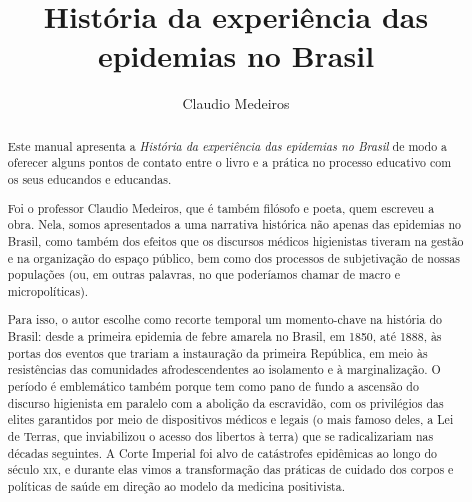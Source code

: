 \documentclass[12pt]{extarticle}
\begin{document}
\newcommand{\AutorLivro}{Claudio Medeiros}
\newcommand{\TituloLivro}{História da experiência das epidemias no Brasil}
\newcommand{\Tema}{Diálogos com a sociologia e com a antropologia}
\newcommand{\Genero}{Narrativa histórica}
\newcommand{\imagemCapa}{./images/PNLD0061-01.png}
\newcommand{\issnppub}{978-65-86598-07-0}
\newcommand{\issnepub}{978-65-86598-08-7}
\newcommand{\colaborador}{{Rafael Zacca Fernandes}}


\title{\TituloLivro}
\author{\AutorLivro}
\def\authornotes{\colaborador}

\date{}
\maketitle

\begin{abstract}

Este manual apresenta a \emph{História da experiência das epidemias no
Brasil} de modo a oferecer alguns pontos de contato entre o livro e a
prática no processo educativo com os seus educandos e educandas.

Foi o professor Claudio Medeiros, que é também filósofo e poeta, quem
escreveu a obra. Nela, somos apresentados a uma narrativa histórica não
apenas das epidemias no Brasil, como também dos efeitos que os discursos
médicos higienistas tiveram na gestão e na organização do espaço
público, bem como dos processos de subjetivação de nossas populações
(ou, em outras palavras, no que poderíamos chamar de macro e
micropolíticas).

Para isso, o autor escolhe como recorte temporal um momento-chave na
história do Brasil: desde a primeira epidemia de febre amarela no
Brasil, em 1850, até 1888, às portas dos eventos que trariam a
instauração da primeira República, em meio às resistências das
comunidades afrodescendentes ao isolamento e à marginalização. O período
é emblemático também porque tem como pano de fundo a ascensão do
discurso higienista em paralelo com a abolição da escravidão, com os
privilégios das elites garantidos por meio de dispositivos médicos e
legais (o mais famoso deles, a Lei de Terras, que inviabilizou o acesso
dos libertos à terra) que se radicalizariam nas décadas seguintes. A
Corte Imperial foi alvo de catástrofes epidêmicas ao longo do século
\textsc{xix}, e durante elas vimos a transformação das práticas de cuidado dos
corpos e políticas de saúde em direção ao modelo da medicina
positivista.


\end{abstract}
\end{document}
